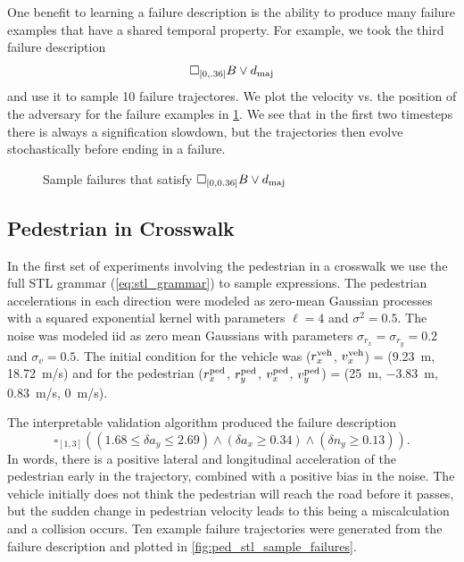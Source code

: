 One benefit to learning a failure description is the ability to produce many failure examples that have a shared temporal property. For example, we took the third failure description
\begin{equation}
    \square_{[0, .36]} B \lor d_{\rm maj}
\end{equation}
and use it to sample \num{10} failure trajectores. We plot the velocity vs. the position of the adversary for the failure examples in \cref{fig:2car_failure_samples}. We see that in the first two timesteps there is always a signification slowdown, but the trajectories then evolve stochastically before ending in a failure. 

\begin{figure}
    \centering
    
    \caption{Sample failures that satisfy $\square_{[0, 0.36]} B \lor d_{\rm maj}$}
    \label{fig:2car_failure_samples}
\end{figure}


\subsection{Pedestrian in Crosswalk}

In the first set of experiments involving the pedestrian in a crosswalk we use the full STL grammar (\cref{eq:stl_grammar}) to sample expressions. The pedestrian accelerations in each direction were modeled as zero-mean Gaussian processes with a squared exponential kernel with parameters $\ell = 4$ and $\sigma^2 = 0.5$. The noise was modeled iid as zero mean Gaussians with parameters $\sigma_{r_x} = \sigma_{r_y} = 0.2$ and $\sigma_{v} = 0.5$. The initial condition for the vehicle was ($r_x^{\rm veh}$, $v_x^{\rm veh}$) = (\SI{9.23}{m}, \SI{18.72}{m/s}) and for the pedestrian ($r^{\rm ped}_x$, $r^{\rm ped}_y$, $v^{\rm ped}_x$, $v^{\rm ped}_y$) = (\SI{25}{m}, \SI{-3.83}{m}, \SI{0.83}{m/s}, \SI{0}{m/s}).

The interpretable validation algorithm produced the failure description
\begin{equation}
\square_{[1,3]}\left((1.68 \leq \delta a_y \leq 2.69) \land (\delta a_x \geq 0.34) \land (\delta n_y \geq 0.13) \right) \label{eq:failure_description_pedstl} \text{.}
\end{equation}
In words, there is a positive lateral and longitudinal acceleration of the pedestrian early in the trajectory, combined with a positive bias in the noise. The vehicle initially does not think the pedestrian will reach the road before it passes, but the sudden change in pedestrian velocity leads to this being a miscalculation and a collision occurs. Ten example failure trajectories were generated from the failure description and plotted in \cref{fig:ped_stl_sample_failures}.

